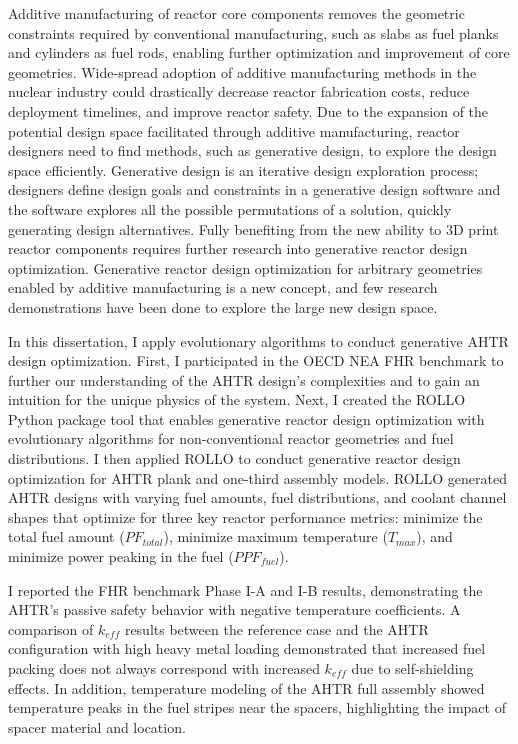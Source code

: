 

Additive manufacturing of reactor core components removes the geometric constraints
required by conventional manufacturing, such as slabs as fuel planks and cylinders 
as fuel rods, enabling further optimization and improvement of core geometries. 
Wide-spread adoption of additive manufacturing methods in the nuclear industry 
could drastically decrease reactor fabrication costs, reduce deployment timelines, 
and improve reactor safety. 
Due to the expansion of the potential design space facilitated through additive 
manufacturing, reactor designers need to find methods, such as generative 
design, to explore the design space efficiently.
Generative design is an iterative design exploration process; designers define design 
goals and constraints in a generative design software and the software explores 
all the possible permutations of a solution, quickly generating design alternatives. 
Fully benefiting from the new ability to 3D print reactor components requires 
further research into generative reactor design optimization.
Generative reactor design optimization for arbitrary geometries enabled by additive 
manufacturing is a new concept, and few research demonstrations have been done to 
explore the large new design space. 

In this dissertation, I apply evolutionary algorithms to conduct generative \gls{AHTR} 
design optimization. 
First, I participated in the \gls{OECD} \gls{NEA} \gls{FHR} benchmark to further our 
understanding of the \gls{AHTR} design's complexities and to gain an intuition 
for the unique physics of the system.  
Next, I created the \gls{ROLLO} Python package tool that enables generative reactor 
design optimization with evolutionary algorithms for non-conventional reactor 
geometries and fuel distributions. 
I then applied \gls{ROLLO} to conduct generative reactor design optimization
for \gls{AHTR} plank and one-third assembly models.
\gls{ROLLO} generated \gls{AHTR} designs with varying fuel amounts, fuel 
distributions, and coolant channel shapes that optimize for three key reactor 
performance metrics: minimize the total fuel amount ($PF_{total}$), minimize maximum 
temperature ($T_{max}$), and minimize power peaking in the fuel ($PPF_{fuel}$).

I reported the \gls{FHR} benchmark Phase I-A and I-B results, demonstrating the 
\gls{AHTR}'s passive safety behavior with negative temperature coefficients.
A comparison of $k_{eff}$ results between the reference case and the \gls{AHTR} 
configuration with high heavy metal loading demonstrated that increased fuel 
packing does not always correspond with increased $k_{eff}$ due to self-shielding 
effects.
In addition, temperature modeling of the \gls{AHTR} full assembly showed temperature 
peaks in the fuel stripes near the spacers, highlighting the impact of spacer material 
and location. 

